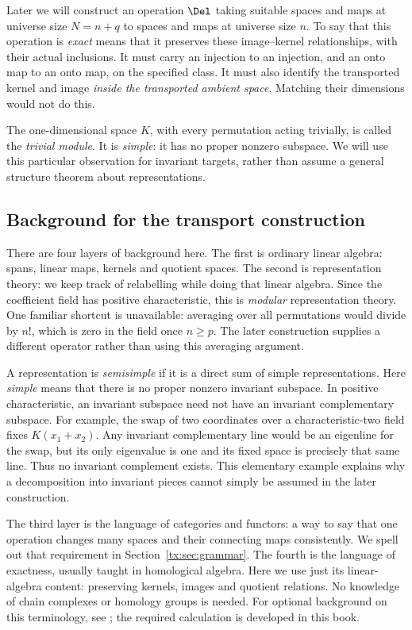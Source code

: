 \documentclass[11pt,a4paper,oneside,openany]{book}
\theoremstyle{definition}\newtheorem{definition}[theorem]{Definition}
\theoremstyle{remark}\newtheorem{remark}[theorem]{Remark}
\numberwithin{equation}{chapter}
\begin{document}
Later we will construct an operation $\Del$ taking suitable spaces and
maps at universe size $N=n+q$ to spaces and maps at universe size $n$.
To say that this operation is \emph{exact} means that it preserves
these image--kernel relationships, with their actual inclusions.
It must carry an injection to an injection, and an onto map to an
onto map, on the specified class. It must also identify the transported
kernel and image \emph{inside the transported ambient space}.
Matching their dimensions would not do this.

The one-dimensional space $K$, with every permutation acting trivially,
is called the \emph{trivial module}. It is \emph{simple}: it has no
proper nonzero subspace. We will use this particular observation for
invariant targets, rather than assume a general structure theorem
about representations.

\subsection{Background for the transport construction}
There are four layers of background here. The first is ordinary
linear algebra: spans, linear maps, kernels and quotient spaces.
The second is representation theory: we keep track of relabelling
while doing that linear algebra. Since the coefficient field has
positive characteristic, this is \emph{modular} representation theory.
One familiar shortcut is unavailable: averaging over all permutations
would divide by $n!$, which is zero in the field once $n\ge p$.
The later construction supplies a different operator rather than
using this averaging argument.

A representation is \emph{semisimple} if it is a direct sum of simple
representations. Here \emph{simple} means that there is no proper
nonzero invariant subspace. In positive characteristic, an invariant subspace
need not have an invariant complementary subspace. For example, the
swap of two coordinates over a characteristic-two field fixes
$K(x_1+x_2)$. Any invariant complementary line would be an eigenline
for the swap, but its only eigenvalue is one and its fixed space is
precisely that same line. Thus no invariant complement exists.
This elementary example explains why a decomposition into invariant
pieces cannot simply be assumed in the later construction.

The third layer is the language of categories and functors: a way to
say that one operation changes many spaces and their connecting
maps consistently. We spell out that requirement in
Section~\ref{tx:sec:grammar}. The fourth is the language of exactness,
usually taught in homological algebra. Here we use just its
linear-algebra content: preserving kernels, images and quotient
relations. No knowledge of chain complexes or homology groups is
needed. For optional background on this terminology, see
\cite{StacksExact}; the required calculation is developed in this book.
\end{document}

